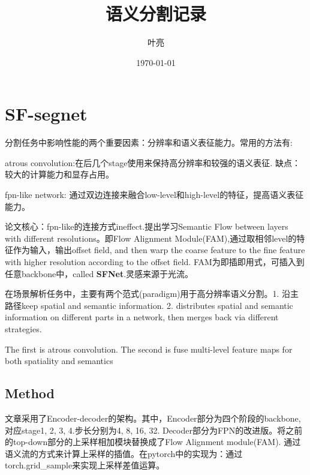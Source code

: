 \documentclass{article}
\title{语义分割记录}
\author{叶亮}
\date{\today}
\begin{document}
 
\maketitle
\tableofcontents
\section{SF-segnet}
分割任务中影响性能的两个重要因素：分辨率和语义表征能力。常用的方法有:

atrous convolution:在后几个stage使用来保持高分辨率和较强的语义表征. 缺点：较大的计算能力和显存占用。

fpn-like network: 通过双边连接来融合low-level和high-level的特征，提高语义表征能力。

论文核心：fpn-like的连接方式ineffect.提出学习Semantic Flow between layers with different resolutions。即Flow Alignment Module(FAM),通过取相邻level的特征作为输入，输出offset field, and then warp the coarse feature to the fine feature with higher resolution according to the offset field. FAM为即插即用式，可插入到任意backbone中，called \textbf{SFNet}.灵感来源于光流。

在场景解析任务中，主要有两个范式(paradigm)用于高分辨率语义分割。1. 沿主路径keep spatial and semantic information. 2. distributes spatial and semantic information on different parts in a network, then merges back via different strategies.

The first is atrous convolution. The second is fuse multi-level feature maps for both spatiality and semantics

\subsection{Method}
文章采用了Encoder-decoder的架构。其中，Encoder部分为四个阶段的backbone,对应stage1, 2, 3, 4.步长分别为4, 8, 16, 32. Decoder部分为FPN的改进版。将之前的top-down部分的上采样相加模块替换成了Flow Alignment module(FAM). 通过语义流的方式来计算上采样的插值。在pytorch中的实现为：通过torch.grid{\_}sample来实现上采样差值运算。	
\end{document}
